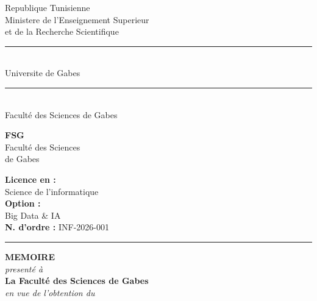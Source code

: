 \documentclass[12pt, oneside, a4paper]{report}
\newcommand{\universityName}{Faculté des Sciences de Gabes}
\begin{document}
\begin{titlepage}
\thispagestyle{empty}
\begin{center}
\begin{minipage}[t]{0.45\textwidth}
\begin{flushleft}
\scriptsize
Republique Tunisienne\\
Ministere de l'Enseignement Superieur\\
et de la Recherche Scientifique\\
\rule{4cm}{0.5pt}\\
Universite de Gabes\\
\rule{4cm}{0.5pt}\\
\universityName
\end{flushleft}
\end{minipage}
\hfill
\begin{minipage}[t]{0.20\textwidth}
\centering
\textbf{FSG}\\
\scriptsize
Faculté des Sciences\\
de Gabes
\end{minipage}
\hfill
\begin{minipage}[t]{0.30\textwidth}
\begin{flushright}
\scriptsize
\textbf{Licence en :}\\
Science de l'informatique\\[0.3em]
\textbf{Option :}\\
Big Data \& IA\\[0.3em]
\textbf{N. d'ordre :} INF-2026-001
\end{flushright}
\end{minipage}

\vspace{0.3cm}
\rule{\textwidth}{1pt}

\vspace{0.6cm}

{\Huge\textbf{MEMOIRE}}\\[0.4cm]

{\large \textit{presenté à}}\\[0.15cm]

\textbf{La Faculté des Sciences de Gabes}\\[0.5cm]

{\large \textit{en vue de l'obtention du}}\\[0.15cm]


\end{center}
\end{titlepage}
\end{document}
